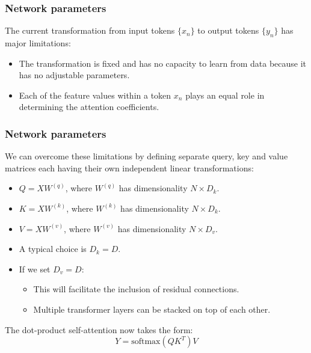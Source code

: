 \documentclass{beamer}
\begin{document}
\begin{frame}
    \frametitle{Network parameters}
    The current transformation from input tokens $\{x_{n}\}$ to output tokens $\{y_{n}\}$ has major limitations:
    \begin{itemize}
        \item The transformation is fixed and has no capacity to learn from data because it has no adjustable parameters.
        \item Each of the feature values within a token $x_{n}$ plays an equal role in determining the attention coefficients.
    \end{itemize}
\end{frame}

\begin{frame}
    \frametitle{Network parameters}
    We can overcome these limitations by defining separate query, key and value matrices each having their own independent linear transformations:
    \begin{itemize}
        \item $Q=XW^{(q)}$, where $W^{(q)}$ has dimensionality $N\times{}D_{k}$.
        \item $K=XW^{(k)}$, where $W^{(k)}$ has dimensionality $N\times{}D_{k}$.
        \item $V=XW^{(v)}$, where $W^{(v)}$ has dimensionality $N\times{}D_{v}$.
        \item A typical choice is $D_{k}=D$.
        \item If we set $D_{v}=D$:
        \begin{itemize}
            \item This will facilitate the inclusion of residual connections.
            \item Multiple transformer layers can be stacked on top of each other.
        \end{itemize}
    \end{itemize}
    The dot-product self-attention now takes the form:
    \begin{equation*}
        Y=\mathrm{softmax}(QK^{T})V
    \end{equation*}
\end{frame}
\end{document}
